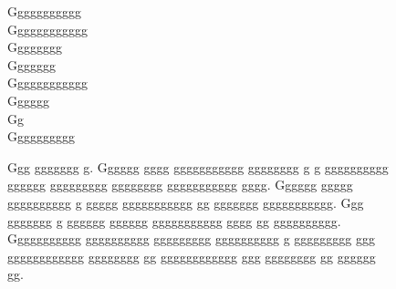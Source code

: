 \documentclass[conference]{IEEEtran}
\begin{document}
\begin{figure}[tb]
\centering
\huge
Ggggggggggg\\
Gggggggggggg\\
Gggggggg\\
Ggggggg\\
Gggggggggggg\\
Gggggg\\
Gg\\
Gggggggggg
\caption{Ggg ggggggg g.  Gggggg gggg ggggggggggg gggggggg g g gggggggggg gggggg ggggggggg gggggggg ggggggggggg gggg.  Gggggg ggggg gggggggggg g ggggg ggggggggggg gg ggggggg ggggggggggg.  Ggg ggggggg g gggggg gggggg ggggggggggg gggg gg gggggggggg.  Ggggggggggg gggggggggg ggggggggg gggggggggg g ggggggggg ggg gggggggggggg gggggggg gg gggggggggggg ggg gggggggg gg gggggg gg.}
\end{figure}
\end{document}
